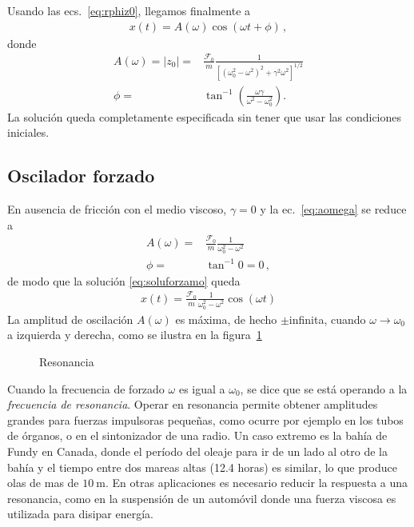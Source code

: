 \begin{frame}
Usando las ecs.~\eqref{eq:rphiz0}, llegamos finalmente a %
\begin{align}
  \label{eq:soluforzamo}
  x(t)=A(\omega)\cos(\omega t+\phi)\,,
\end{align}
donde
\begin{align}
  \label{eq:aomega}
  A(\omega)=|z_0|=&\frac{\mathcal{F}_0}{m}\frac{1}{\left[\left(\omega_0^2-\omega^2\right)^2+\gamma^2\omega^2\right]^{1/2}}\nonumber\\
  \phi=&\tan^{-1}\left(\frac{\omega\gamma}{\omega^2-\omega_0^2}\right).
\end{align}
La solución queda completamente especificada sin tener que usar las condiciones iniciales. %
\end{frame}

\subsection{Oscilador forzado}
En ausencia de fricción con el medio viscoso, $\gamma=0$ y la ec.~\eqref{eq:aomega} se reduce a
\begin{align*}
  A(\omega)=&\frac{\mathcal{F}_0}{m}\frac{1}{\omega_0^2-\omega^2}\nonumber\\
  \phi=&\tan^{-1}0=0\,,
\end{align*}
de modo que la solución \eqref{eq:soluforzamo} queda 
\begin{align*}
  x(t)=\frac{\mathcal{F}_0}{m}\frac{1}{\omega_0^2-\omega^2}\cos(\omega t)
\end{align*}
La amplitud de oscilación $A(\omega)$ es máxima, de hecho $\pm$infinita, cuando $\omega\to \omega_0$ a izquierda y derecha, como se ilustra en la figura~\ref{fig:resonance}
\begin{frame}
  \begin{figure}
    \centering
    \caption{Resonancia}
    \label{fig:resonance}
  \end{figure}
\end{frame}


Cuando la frecuencia de forzado $\omega$ es igual a $\omega_0$, se dice que se está operando a la \emph{frecuencia de resonancia}. Operar en resonancia permite obtener amplitudes grandes para fuerzas impulsoras pequeñas, como ocurre por ejemplo en los tubos de órganos, o en el sintonizador de una radio. Un caso extremo es la bahía de Fundy en Canada, donde el período del oleaje para ir de un lado al otro de la bahía y el tiempo entre dos mareas altas (12.4 horas) es similar, lo que produce olas de mas de $\SI{10}{\meter}$.  En otras aplicaciones es necesario reducir la respuesta a una resonancia, como en la suspensión de un automóvil donde una fuerza viscosa es utilizada para disipar energía. 


